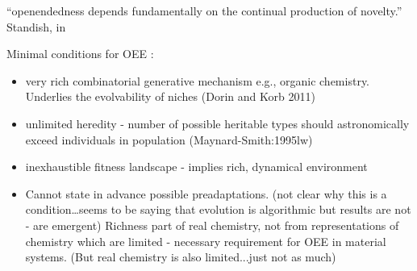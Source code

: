 ``openendedness depends fundamentally on the continual production of novelty.'' Standish, in \autocite{Soros2014}

Minimal conditions for OEE \autocite{Vasas2015}:
\begin{itemize}
	\item
	
	very rich combinatorial generative mechanism e.g., organic
	chemistry. Underlies the evolvability of niches (Dorin and Korb
	2011)
	
	\item
	
	unlimited heredity - number of possible heritable types should
	astronomically exceed individuals in population
	(Maynard-Smith:1995lw)
	
	\item
	
	inexhaustible fitness landscape - implies rich, dynamical
	environment
	
	\item
	
	Cannot state in advance possible preadaptations. (not clear why this
	is a condition\ldots{}seems to be saying that evolution is
	algorithmic but results are not - are emergent) Richness part of
	real chemistry, not from representations of chemistry which are
	limited - necessary requirement for OEE in material systems. (But
	real chemistry is also limited...just not as much)
	
\end{itemize}

{\autocite{Ruiz-Mirazo2004}}

